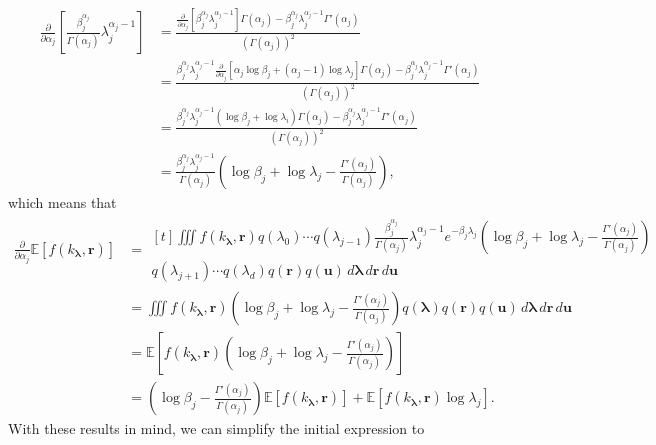 \documentclass{article}
\theoremstyle{definition}
\newcommand{\da}{\frac{\partial}{\partial\alpha_j}}
\begin{document}
\[
  \begin{split}
    \da \left[ \frac{\beta_j^{\alpha_j}}{\Gamma(\alpha_j)} \lambda_j^{\alpha_j - 1} \right] &=
    \frac{\da[\beta_j^{\alpha_j}\lambda_j^{\alpha_j - 1}]\Gamma(\alpha_j) -
      \beta_j^{\alpha_j}\lambda_j^{\alpha_j - 1}\Gamma'(\alpha_j)}{(\Gamma(\alpha_j))^2} \\
    &= \frac{\beta_j^{\alpha_j}\lambda_j^{\alpha_j - 1}\da[\alpha_j\log\beta_j + (\alpha_j -
      1)\log\lambda_j]\Gamma(\alpha_j) - \beta_j^{\alpha_j}\lambda_j^{\alpha_j -
        1}\Gamma'(\alpha_j)}{(\Gamma(\alpha_j))^2} \\
    &= \frac{\beta_j^{\alpha_j}\lambda_j^{\alpha_j - 1}(\log\beta_j + \log\lambda_i)\Gamma(\alpha_j)
      - \beta_j^{\alpha_j}\lambda_j^{\alpha_j - 1}\Gamma'(\alpha_j)}{(\Gamma(\alpha_j))^2} \\
    &= \frac{\beta_j^{\alpha_j}\lambda_j^{\alpha_j - 1}}{\Gamma(\alpha_j)}\left(\log\beta_j +
    \log\lambda_j - \frac{\Gamma'(\alpha_j)}{\Gamma(\alpha_j)}\right),
  \end{split}
\]
which means that
\[
  \begin{split}
    \da\mathbb{E}[f(k_{\bm\lambda}, \mathbf{r})] &= \begin{multlined}[t]
      \iiint f(k_{\bm\lambda}, \mathbf{r}) q(\lambda_0) \cdots q(\lambda_{j-1})
      \frac{\beta_j^{\alpha_j}}{\Gamma(\alpha_j)}\lambda_j^{\alpha_j -
        1}e^{-\beta_j\lambda_j} \left(\log\beta_j + \log\lambda_j -
        \frac{\Gamma'(\alpha_j)}{\Gamma(\alpha_j)} \right) \\
      q(\lambda_{j+1}) \cdots q(\lambda_d)
      q(\mathbf{r})q(\mathbf{u})\,d\bm\lambda\,d\mathbf{r}\,d\mathbf{u}
    \end{multlined} \\
    &= \iiint f(k_{\bm\lambda}, \mathbf{r}) \left(\log\beta_j + \log\lambda_j -
      \frac{\Gamma'(\alpha_j)}{\Gamma(\alpha_j)} \right) q(\bm\lambda)
    q(\mathbf{r})q(\mathbf{u})\,d\bm\lambda\,d\mathbf{r}\,d\mathbf{u} \\
    &= \mathbb{E} \left[ f(k_{\bm\lambda}, \mathbf{r}) \left(\log\beta_j +
        \log\lambda_j - \frac{\Gamma'(\alpha_j)}{\Gamma(\alpha_j)} \right)
    \right] \\
    &= \left( \log\beta_j - \frac{\Gamma'(\alpha_j)}{\Gamma(\alpha_j)}
    \right)\mathbb{E}[f(k_{\bm\lambda}, \mathbf{r})] +
    \mathbb{E}[f(k_{\bm\lambda}, \mathbf{r})\log\lambda_j].
  \end{split}
\]
With these results in mind, we can simplify the initial expression to
\end{document}
